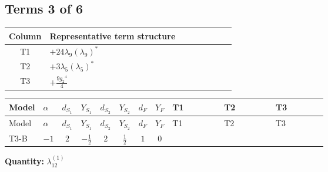 \documentclass[8pt]{article}
\begin{document}
\begin{landscape}
\subsection*{Terms 3 of 6}
\begin{center}
\begin{tabular}{@{}c >{\raggedright\arraybackslash}p{0.82\linewidth}@{}}
\toprule
Column & Representative term structure \\
\midrule
T1 & \(\displaystyle +24 {\lambda_{9}} \left({\lambda_{9}}\right)^{*}\) \\
\midrule
T2 & \(\displaystyle +3 {\lambda_5} \left({\lambda_5}\right)^{*}\) \\
\midrule
T3 & \(\displaystyle +\frac{9 {g_2}^4}{4}\) \\
\midrule
\bottomrule
\end{tabular}
\end{center}
\smallskip
\tiny
\begin{longtable}{@{}llcccccc >{\raggedright\arraybackslash}p{0.21\linewidth} >{\raggedright\arraybackslash}p{0.21\linewidth} >{\raggedright\arraybackslash}p{0.21\linewidth}@{}}
\toprule
Model & $\alpha$ & $d_{S_1}$ & $Y_{S_1}$ & $d_{S_2}$ & $Y_{S_2}$ & $d_F$ & $Y_F$ & T1 & T2 & T3 \\
\midrule
\endfirsthead
\toprule
Model & $\alpha$ & $d_{S_1}$ & $Y_{S_1}$ & $d_{S_2}$ & $Y_{S_2}$ & $d_F$ & $Y_F$ & T1 & T2 & T3 \\
\midrule
\endhead
T3-B & $-1$ & $2$ & $-\frac{1}{2}$ & $2$ & $\frac{1}{2}$ & $1$ & $0$ & \scriptsize\adjustbox{max width=\linewidth}{$\begin{gathered} +24 {\lambda_{9}} \left({\lambda_{9}}\right)^{*}\end{gathered}$} & \scriptsize\adjustbox{max width=\linewidth}{$\begin{gathered} +3 {\lambda_5} \left({\lambda_5}\right)^{*}\end{gathered}$} & \scriptsize\adjustbox{max width=\linewidth}{$\begin{gathered} +\frac{9 {g_2}^4}{4}\end{gathered}$} \\
\midrule
\bottomrule
\end{longtable}
\clearpage
\noindent\textbf{Quantity: }$\lambda_{12}^{(1)}$\par\smallskip

\end{landscape}
\end{document}

